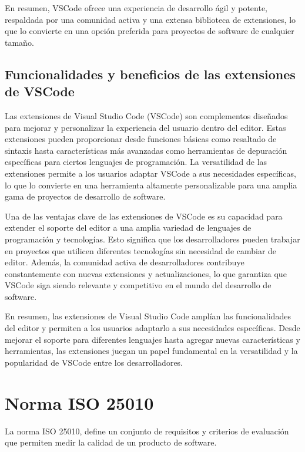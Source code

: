 En resumen, VSCode ofrece una experiencia de desarrollo ágil y potente, respaldada por una comunidad activa y una extensa biblioteca de extensiones, lo que lo convierte en una opción preferida para proyectos de software de cualquier tamaño.

\subsection{Funcionalidades y beneficios de las extensiones de VSCode}
Las extensiones de Visual Studio Code (VSCode) son complementos diseñados para mejorar y personalizar la experiencia del usuario dentro del editor. Estas extensiones pueden proporcionar desde funciones básicas como resaltado de sintaxis hasta características más avanzadas como herramientas de depuración específicas para ciertos lenguajes de programación. La versatilidad de las extensiones permite a los usuarios adaptar VSCode a sus necesidades específicas, lo que lo convierte en una herramienta altamente personalizable para una amplia gama de proyectos de desarrollo de software.

Una de las ventajas clave de las extensiones de VSCode es su capacidad para extender el soporte del editor a una amplia variedad de lenguajes de programación y tecnologías. Esto significa que los desarrolladores pueden trabajar en proyectos que utilicen diferentes tecnologías sin necesidad de cambiar de editor. Además, la comunidad activa de desarrolladores contribuye constantemente con nuevas extensiones y actualizaciones, lo que garantiza que VSCode siga siendo relevante y competitivo en el mundo del desarrollo de software. \parencite{Nandwana2023}

En resumen, las extensiones de Visual Studio Code amplían las funcionalidades del editor y permiten a los usuarios adaptarlo a sus necesidades específicas. Desde mejorar el soporte para diferentes lenguajes hasta agregar nuevas características y herramientas, las extensiones juegan un papel fundamental en la versatilidad y la popularidad de VSCode entre los desarrolladores.

\section{Norma ISO 25010}
La norma ISO 25010, define un conjunto de requisitos y criterios de evaluación que permiten medir la calidad de un producto de software. \parencite{Ormeño2019}

